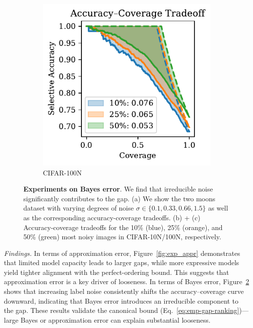 \begin{figure}[t]
\begin{subfigure}[t]{0.24\textwidth}
    \includegraphics[width=\linewidth]{figs/sc_bounds/cifar100_noisy_tradeoff.pdf}
    \caption{CIFAR-100N}
    \label{fig:right}
  \end{subfigure}
  \caption[Experiments on Bayes error.]{\textbf{Experiments on Bayes error}. We find that irreducible noise significantly contributes to the gap. (a) We show the two moons dataset with varying degrees of noise $\sigma \in \{0.1,0.33,0.66,1.5\}$ as well as the corresponding accuracy-coverage tradeoffs. (b) + (c) Accuracy-coverage tradeoffs for the 10\% (blue), 25\% (orange), and 50\% (green) most noisy images in CIFAR-10N/100N, respectively.}
  \label{fig:exp_bayes}
\end{figure}

\emph{Findings.}
In terms of approximation error, Figure~\ref{fig:exp_appr} demonstrates that limited model capacity leads to larger gaps, while more expressive models yield tighter alignment with the perfect-ordering bound. This suggests that approximation error is a key driver of looseness. In terms of Bayes error, Figure~\ref{fig:exp_bayes} shows that increasing label noise consistently shifts the accuracy--coverage curve downward, indicating that Bayes error introduces an irreducible component to the gap. These results validate the canonical bound (Eq.~\ref{eq:emp-gap-ranking})---large Bayes or approximation error can explain substantial looseness.

